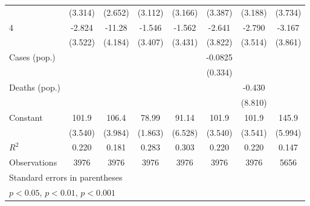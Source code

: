 \documentclass{article}
\begin{document}
{\begin{longtable}{l*{7}{c}}
                &  (3.314)         &  (2.652)         &  (3.112)         &  (3.166)         &  (3.387)         &  (3.188)         &  (3.734)         \\
4               &   -2.824         &   -11.28\sym{*}  &   -1.546         &   -1.562         &   -2.641         &   -2.790         &   -3.167         \\
                &  (3.522)         &  (4.184)         &  (3.407)         &  (3.431)         &  (3.822)         &  (3.514)         &  (3.861)         \\
Cases (pop.)    &                  &                  &                  &                  &  -0.0825         &                  &                  \\
                &                  &                  &                  &                  &  (0.334)         &                  &                  \\
Deaths (pop.)   &                  &                  &                  &                  &                  &   -0.430         &                  \\
                &                  &                  &                  &                  &                  &  (8.810)         &                  \\
Constant        &    101.9\sym{***}&    106.4\sym{***}&    78.99\sym{***}&    91.14\sym{***}&    101.9\sym{***}&    101.9\sym{***}&    145.9\sym{***}\\
                &  (3.540)         &  (3.984)         &  (1.863)         &  (6.528)         &  (3.540)         &  (3.541)         &  (5.994)         \\
\hline
\(R^{2}\)       &    0.220         &    0.181         &    0.283         &    0.303         &    0.220         &    0.220         &    0.147         \\
Observations    &     3976         &     3976         &     3976         &     3976         &     3976         &     3976         &     5656         \\
\hline\hline
\multicolumn{8}{l}{\footnotesize Standard errors in parentheses}\\
\multicolumn{8}{l}{\footnotesize \sym{*} \(p<0.05\), \sym{**} \(p<0.01\), \sym{***} \(p<0.001\)}\\
\end{longtable}
}
\end{document}
